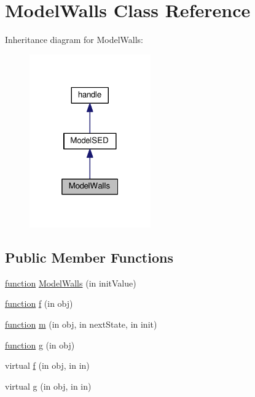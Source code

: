 \hypertarget{class_model_walls}{}\section{Model\+Walls Class Reference}
\label{class_model_walls}


Inheritance diagram for Model\+Walls\+:
\nopagebreak
\begin{figure}[H]
\begin{center}
\leavevmode
\includegraphics[width=148pt]{class_model_walls__inherit__graph}
\end{center}
\end{figure}
\subsection*{Public Member Functions}
\begin{DoxyCompactItemize}
\item 
\hyperlink{_plan__desuma_functions__2_players_8m_ac2ffb26d6f42d3bbcd7847b0873403f4}{function} \hyperlink{class_model_walls_a5aa5cfd2186c06e8ab37ce531b1a9720}{Model\+Walls} (in init\+Value)
\item 
\hyperlink{_plan__desuma_functions__2_players_8m_ac2ffb26d6f42d3bbcd7847b0873403f4}{function} \hyperlink{class_model_walls_af07620c51528eb1e504befcf52ca0cee}{f} (in obj)
\item 
\hyperlink{_plan__desuma_functions__2_players_8m_ac2ffb26d6f42d3bbcd7847b0873403f4}{function} \hyperlink{class_model_walls_a3140f24c6c4b80037b7d4f521c6ae2d3}{m} (in obj, in next\+State, in init)
\item 
\hyperlink{_plan__desuma_functions__2_players_8m_ac2ffb26d6f42d3bbcd7847b0873403f4}{function} \hyperlink{class_model_walls_a07dadfabe92bf9a144b8a862720e7746}{g} (in obj)
\item 
virtual \hyperlink{class_model_s_e_d_ac36f9451c43b120828af4380858f2024}{f} (in obj, in in)
\item 
virtual \hyperlink{class_model_s_e_d_a2d53b5f665cfcf64d482bbfa8a6eb098}{g} (in obj, in in)
\end{DoxyCompactItemize}
